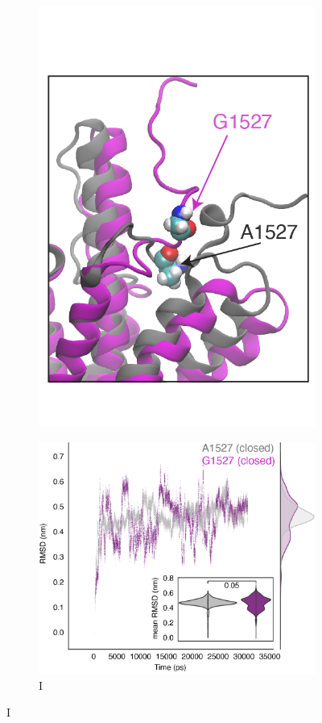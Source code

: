 \documentclass[12pt]{article}
\begin{document}
\begin{figure}[H]
\begin{subfigure}[t]{0.165\textwidth}
        \includegraphics[width=\textwidth]{./main_plots/abca7_inset_only.png}        
    \end{subfigure}
    \hspace{0.01\textwidth} \begin{subfigure}[t]{0.32\textwidth}
        \caption{I}
        \includegraphics[width=\textwidth]{./main_plots/variant_dynamics.png}        

\end{subfigure}
\end{figure}
\end{document}
